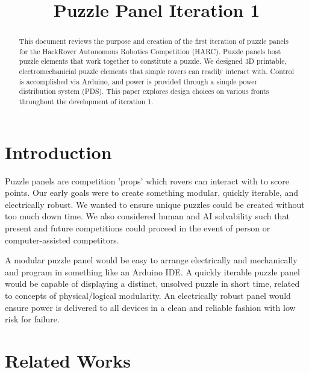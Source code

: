 \documentclass[conference]{IEEEtran}
\begin{document}
\title{Puzzle Panel Iteration 1\\}
\author{
}

\maketitle

\begin{abstract}
This document reviews the purpose and creation of the first iteration of puzzle panels for the HackRover Autonomous Robotics Competition (HARC). Puzzle panels host  puzzle elements that work together to constitute a puzzle. We designed 3D printable, electromechanicial puzzle elements that simple rovers can readily interact with. Control is accomplished via Arduino, and power is provided through a simple power distribution system (PDS). This paper explores design choices on various fronts throughout the development of iteration 1. 
\end{abstract}

\section{Introduction}
Puzzle panels are competition 'props' which rovers can interact with to score points. Our early goals were to create something modular, quickly iterable, and electrically robust. We wanted to ensure unique puzzles could be created without too much down time. We also considered human and AI solvability such that present and future competitions could proceed in the event of person or computer-assisted competitors.

A modular puzzle panel would be easy to arrange electrically and mechanically and program in something like an Arduino IDE. A quickly iterable puzzle panel would be capable of displaying a distinct, unsolved puzzle in short time, related to concepts of physical/logical modularity. An electrically robust panel would ensure power is delivered to all devices in a clean and reliable fashion with low risk for failure.

\section{Related Works}
\end{document}
